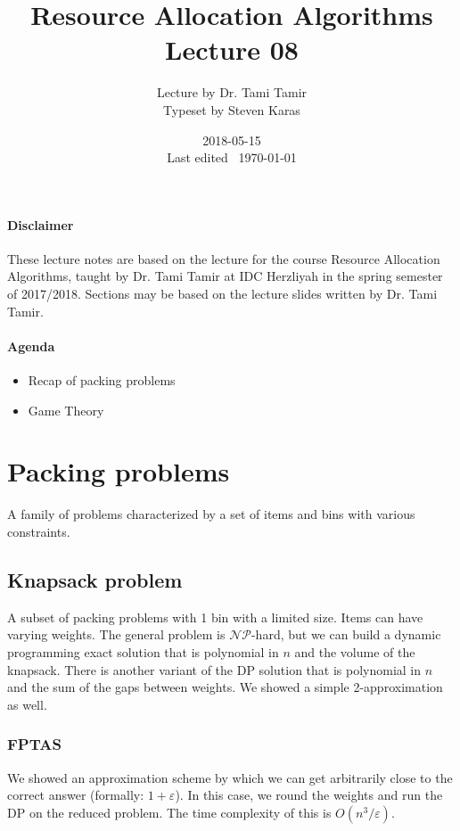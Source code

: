\documentclass{idc_msc}
\title{Resource Allocation Algorithms\\\large Lecture 08}
\date{2018-05-15 \\ Last edited \currenttime\ \today}
\author{Lecture by Dr. Tami Tamir\\Typeset by Steven Karas}
\newcommand{\NPclass}{\mathcal{NP}}
\begin{document}
\maketitle

\nocite{pinedo2016scheduling}

\paragraph{Disclaimer}

These lecture notes are based on the lecture for the course Resource Allocation Algorithms, taught by Dr. Tami Tamir at IDC Herzliyah in the spring semester of 2017/2018.
Sections may be based on the lecture slides written by Dr. Tami Tamir.

\paragraph{Agenda}

\begin{itemize}
  \item Recap of packing problems
  \item Game Theory
\end{itemize}

\section{Packing problems}

A family of problems characterized by a set of items and bins with various constraints.

\subsection{Knapsack problem}

A subset of packing problems with 1 bin with a limited size.
Items can have varying weights.
The general problem is \(\NPclass\)-hard, but we can build a dynamic programming exact solution that is polynomial in \(n\) and the volume of the knapsack.
There is another variant of the DP solution that is polynomial in \(n\) and the sum of the gaps between weights.
We showed a simple 2-approximation as well.

\subsubsection{FPTAS}

We showed an approximation scheme by which we can get arbitrarily close to the correct answer (formally: \(1 + \varepsilon\)).
In this case, we round the weights and run the DP on the reduced problem.
The time complexity of this is \(O(n^3 / \varepsilon)\).
\end{document}
